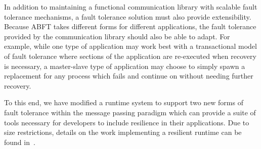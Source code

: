 In addition to maintaining a functional communication library with scalable fault tolerance mechanisms, a fault tolerance solution must also provide extensibility. Because ABFT takes different forms for different applications, the fault tolerance provided by the communication library should also be able to adapt. For example, while one type of application may work best with a transactional model of fault tolerance where sections of the application are re-executed when recovery is necessary, a master-slave type of application may choose to simply spawn a replacement for any process which fails and continue on without needing further recovery.

To this end, we have modified a runtime system to support two new forms of fault tolerance within the message passing paradigm which can provide a suite of tools necessary for developers to include resilience in their applications. Due to size restrictions, details on the work implementing a resilient runtime can be found in~\cite{Bland:CCGrid12}.